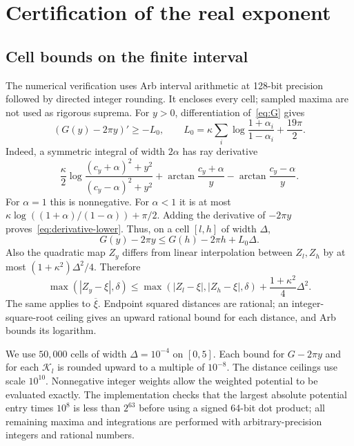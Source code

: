 \section{Certification of the real exponent}\label{sec:real-cert}
\subsection{Cell bounds on the finite interval}
The numerical verification uses Arb interval arithmetic at 128-bit
precision followed by directed integer rounding.  It encloses every
cell; sampled maxima are not used as rigorous suprema.
For $y>0$, differentiation of~\eqref{eq:G} gives
\begin{equation}\label{eq:derivative-lower}
 (G(y)-2\pi y)'\ge-L_0,\qquad
 L_0=\kappa\sum_i\log\frac{1+\alpha_i}{1-\alpha_i}
                    +\frac{19\pi}{2}.
\end{equation}
Indeed, a symmetric integral of width $2\alpha$ has ray derivative
\[
 \frac\kappa2\log\frac{(c_y+\alpha)^2+y^2}{(c_y-\alpha)^2+y^2}
       +\arctan\frac{c_y+\alpha}{y}-\arctan\frac{c_y-\alpha}{y}.
\]
For $\alpha=1$ this is nonnegative.  For $\alpha<1$ it is at most
$\kappa\log((1+\alpha)/(1-\alpha))+\pi/2$.
Adding the derivative of $-2\pi y$ proves~\eqref{eq:derivative-lower}.
Thus, on a cell $[l,h]$ of width $\Delta$,
\[
 G(y)-2\pi y\le G(h)-2\pi h+L_0\Delta.
\]
Also the quadratic map $Z_y$ differs from linear interpolation between
$Z_l,Z_h$ by at most $(1+\kappa^2)\Delta^2/4$.  Therefore
\begin{equation}\label{eq:distance-cell}
 \max(|Z_y-\xi|,\delta)\le
 \max(|Z_l-\xi|,|Z_h-\xi|,\delta)+\frac{1+\kappa^2}{4}\Delta^2.
\end{equation}
The same applies to $\overline\xi$.  Endpoint squared distances are
rational; an integer-square-root ceiling gives an upward rational
bound for each distance, and Arb bounds its logarithm.

We use $50{,}000$ cells of width $\Delta=10^{-4}$ on $[0,5]$.
Each bound for $G-2\pi y$ and for each $\mathcal K_l$ is rounded
upward to a multiple of $10^{-8}$.  The distance ceilings use scale
$10^{10}$.  Nonnegative integer weights allow the weighted potential
to be evaluated exactly.  The implementation checks that the largest
absolute potential entry times $10^8$ is less than $2^{63}$ before
using a signed 64-bit dot product; all remaining maxima and
integrations are performed with arbitrary-precision integers and
rational numbers.

